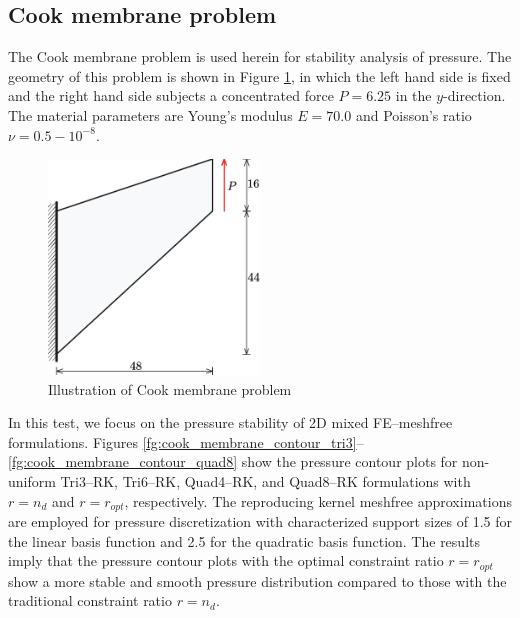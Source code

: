 \subsection{Cook membrane problem}

The Cook membrane problem \cite{simo1990} is used herein for stability analysis of pressure. The geometry of this problem is shown in Figure \ref{fg:cook_illsutration}, in which the left hand side is fixed and the right hand side subjects a concentrated force $P=6.25$ in the $y$-direction. The material parameters are Young's modulus $E=70.0$ and Poisson's ratio $\nu=0.5-10^{-8}$.

\begin{figure}[H]
\centering
\includegraphics[width=0.5\textwidth]{png/cook_membrane_model.png}
\caption{Illustration of Cook membrane problem}\label{fg:cook_illsutration}
\end{figure}

In this test, we focus on the pressure stability of 2D mixed FE--meshfree formulations. Figures \ref{fg:cook_membrane_contour_tri3}--\ref{fg:cook_membrane_contour_quad8} show the pressure contour plots for non-uniform Tri3--RK, Tri6--RK, Quad4--RK, and Quad8--RK formulations with $r=n_d$ and $r=r_{opt}$, respectively. The reproducing kernel meshfree approximations are employed for pressure discretization with characterized support sizes of 1.5 for the linear basis function and 2.5 for the quadratic basis function. The results imply that the pressure contour plots with the optimal constraint ratio $r=r_{opt}$ show a more stable and smooth pressure distribution compared to those with the traditional constraint ratio $r=n_d$.

